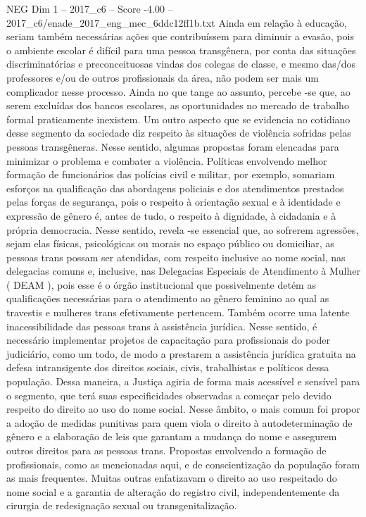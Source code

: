 \begin{textsample}{NEG Dim 1 – 2017\_c6 – Score -4.00 – 2017\_c6/enade\_2017\_eng\_mec\_6ddc12ff1b.txt}
Ainda em relação à educação, seriam também necessárias ações que contribuíssem para diminuir a evasão, pois o ambiente escolar é difícil para uma pessoa transgênera, por conta das situações discriminatórias e preconceituosas vindas dos colegas de classe, e mesmo das/dos professores e/ou de outros profissionais da área, não podem ser mais um complicador nesse processo.
Ainda no que tange ao assunto, percebe -se que, ao serem excluídas dos bancos escolares, as oportunidades no mercado de trabalho formal praticamente inexistem.
Um outro aspecto que se evidencia no cotidiano desse segmento da sociedade diz respeito às situações de violência sofridas pelas pessoas transgêneras.
Nesse sentido, algumas propostas foram elencadas para minimizar o problema e combater a violência.
Políticas envolvendo melhor formação de funcionários das polícias civil e militar, por exemplo, somariam esforços na qualificação das abordagens policiais e dos atendimentos prestados pelas forças de segurança, pois o respeito à orientação sexual e à identidade e expressão de gênero é, antes de tudo, o respeito à dignidade, à cidadania e à própria democracia.
Nesse sentido, revela -se essencial que, ao sofrerem agressões, sejam elas físicas, psicológicas ou morais no espaço público ou domiciliar, as pessoas trans possam ser atendidas, com respeito inclusive ao nome social, nas delegacias comuns e, inclusive, nas Delegacias Especiais de Atendimento à Mulher ( DEAM ), pois esse é o órgão institucional que possivelmente detém as qualificações necessárias para o atendimento ao gênero feminino ao qual as travestis e mulheres trans efetivamente pertencem.
Também ocorre uma latente inacessibilidade das pessoas trans à assistência jurídica.
Nesse sentido, é necessário implementar projetos de capacitação para profissionais do poder judiciário, como um todo, de modo a prestarem a assistência jurídica gratuita na defesa intransigente dos direitos sociais, civis, trabalhistas e políticos dessa população.
Dessa maneira, a Justiça agiria de forma mais acessível e sensível para o segmento, que terá suas especificidades observadas a começar pelo devido respeito do direito ao uso do nome social.
Nesse âmbito, o mais comum foi propor a adoção de medidas punitivas para quem viola o direito à autodeterminação de gênero e a elaboração de leis que garantam a mudança do nome e assegurem outros direitos para as pessoas trans.
Propostas envolvendo a formação de profissionais, como as mencionadas aqui, e de conscientização da população foram as mais frequentes.
Muitas outras enfatizavam o direito ao uso respeitado do nome social e a garantia de alteração do registro civil, independentemente da cirurgia de redesignação sexual ou transgenitalização.

\end{textsample}
